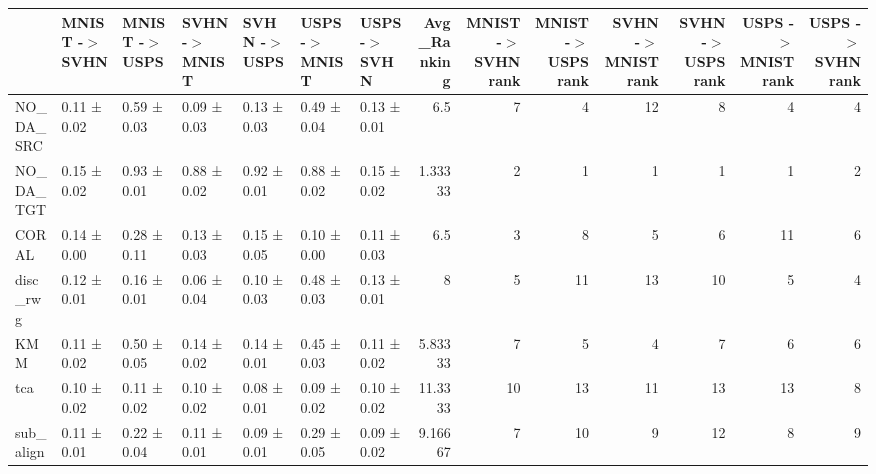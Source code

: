 \begin{tabular}{lllllllrrrrrrr}
\hline
           & MNIST -\ensuremath{>} SVHN   & MNIST -\ensuremath{>} USPS   & SVHN -\ensuremath{>} MNIST   & SVHN -\ensuremath{>} USPS   & USPS -\ensuremath{>} MNIST   & USPS -\ensuremath{>} SVHN   &   Avg\_Ranking &   MNIST -\ensuremath{>} SVHN rank &   MNIST -\ensuremath{>} USPS rank &   SVHN -\ensuremath{>} MNIST rank &   SVHN -\ensuremath{>} USPS rank &   USPS -\ensuremath{>} MNIST rank &   USPS -\ensuremath{>} SVHN rank \\
\hline
 NO\_DA\_SRC & 0.11 ± 0.02     & 0.59 ± 0.03     & 0.09 ± 0.03     & 0.13 ± 0.03    & 0.49 ± 0.04     & 0.13 ± 0.01    &       6.5     &                    7 &                    4 &                   12 &                   8 &                    4 &                   4 \\
 NO\_DA\_TGT & 0.15 ± 0.02     & 0.93 ± 0.01     & 0.88 ± 0.02     & 0.92 ± 0.01    & 0.88 ± 0.02     & 0.15 ± 0.02    &       1.33333 &                    2 &                    1 &                    1 &                   1 &                    1 &                   2 \\
 CORAL     & 0.14 ± 0.00     & 0.28 ± 0.11     & 0.13 ± 0.03     & 0.15 ± 0.05    & 0.10 ± 0.00     & 0.11 ± 0.03    &       6.5     &                    3 &                    8 &                    5 &                   6 &                   11 &                   6 \\
 disc\_rwg  & 0.12 ± 0.01     & 0.16 ± 0.01     & 0.06 ± 0.04     & 0.10 ± 0.03    & 0.48 ± 0.03     & 0.13 ± 0.01    &       8       &                    5 &                   11 &                   13 &                  10 &                    5 &                   4 \\
 KMM       & 0.11 ± 0.02     & 0.50 ± 0.05     & 0.14 ± 0.02     & 0.14 ± 0.01    & 0.45 ± 0.03     & 0.11 ± 0.02    &       5.83333 &                    7 &                    5 &                    4 &                   7 &                    6 &                   6 \\
 tca       & 0.10 ± 0.02     & 0.11 ± 0.02     & 0.10 ± 0.02     & 0.08 ± 0.01    & 0.09 ± 0.02     & 0.10 ± 0.02    &      11.3333  &                   10 &                   13 &                   11 &                  13 &                   13 &                   8 \\
 sub\_align & 0.11 ± 0.01     & 0.22 ± 0.04     & 0.11 ± 0.01     & 0.09 ± 0.01    & 0.29 ± 0.05     & 0.09 ± 0.02    &       9.16667 &                    7 &                   10 &                    9 &                  12 &                    8 &                   9 \\

\end{tabular}
